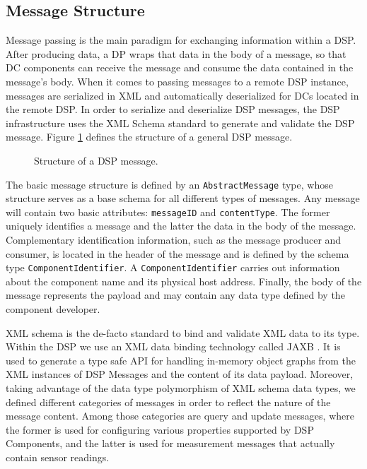 \documentclass[conference]{IEEEtran}
\begin{document}
\subsection{Message Structure}

Message passing is the main paradigm for exchanging information within
a DSP. After producing data, a DP wraps that data in the body
of a message, so that DC components can receive the message and
consume the data contained in the message's body. When it comes to passing
messages to a remote DSP instance, messages are serialized in XML
\cite{xml2000} and automatically deserialized for DCs located in the
remote DSP. In order to serialize and deserialize DSP messages, the
DSP infrastructure uses the XML Schema standard \cite{xml-schema2004}
to generate and validate the DSP message. Figure \ref{FIG_DSP_MESSAGE}
defines the structure of a general DSP message.

\begin{figure}[!htb]
 \centering
 \caption{\label{FIG_DSP_MESSAGE} Structure of a DSP message.}
\end{figure}

The basic message structure is defined by an \texttt{AbstractMessage}
type, whose structure serves as a base schema for all different types
of messages. Any message will contain two basic attributes:
\texttt{messageID} and \texttt{contentType}.  The former uniquely
identifies a message and the latter the data in the body of the
message. Complementary identification information, such as the message
producer and consumer, is located in the header of the message and 
is defined by the schema type \texttt{ComponentIdentifier}. A
\texttt{ComponentIdentifier} carries out information about the
component name and its physical host address.  Finally, the body of
the message represents the payload and may contain any data type
defined by the component developer.

XML schema is the de-facto standard to bind and validate XML
data to its type. Within the DSP we use an XML
data binding technology \cite{xml-dbind} called JAXB \cite{xml-jaxb}.
It is used to generate a type safe API for handling in-memory object
graphs from the XML instances of DSP Messages and the content of its
data payload. Moreover, taking advantage of the data type polymorphism
of XML schema data types, we defined different categories of messages in order to
reflect the nature of the message content. Among those categories are
query and update messages, where the former is used for configuring various
properties supported by DSP Components, and the latter is used for measurement
messages that actually contain sensor readings.
\end{document}
